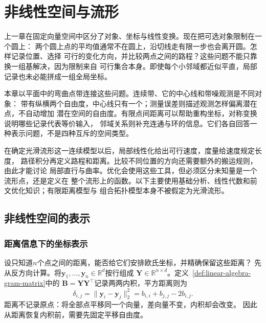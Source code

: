\chapter{非线性空间与流形}
\label{chap:differential-geometry-and-symmetry}

上一章在固定向量空间中区分了对象、坐标与线性变换。现在把可选对象限制在一个圆上：
两个圆上点的平均值通常不在圆上，沿切线走有限一步也会离开圆。怎样记录位置、选择
可行的变化方向，并比较两点之间的路程？这些问题不能只靠换一组基解决，因为限制来自
可行集合本身。即使每个小邻域都近似平直，局部记录也未必能拼成一组全局坐标。

本章以平面中的弯曲点带连接这些问题。连续带、它的中心线和带噪观测是不同对象：
带有纵横两个自由度，中心线只有一个；测量误差则描述观测怎样偏离潜在点，不自动增加
潜在空间的自由度。有限点间距离可以帮助重构坐标，对称变换说明哪些记录代表等价输入，
邻域关系则补充连通与环的信息。它们各自回答一种表示问题，不是四种互斥的空间类型。

在确定光滑流形这一连续模型以后，局部线性化给出可行速度，度量给速度规定长度，
路径积分再定义路程和距离。比较不同位置的方向还需要额外的搬运规则，由此才能讨论
局部直行与曲率。优化会使用这些工具，但必须区分未知量是一个流形点，还是定义在
整个流形上的函数。以下主要使用基础分析、线性代数和前文优化知识；有限距离模型与
组合拓扑模型本身不被假定为光滑流形。

\section{非线性空间的表示}
\label{sec:geometry-nonlinear-representations}

\subsection{距离信息下的坐标表示}
\label{sec:geometry-distance-coordinate-embedding}

设只知道$n$个点之间的距离，能否给它们安排欧氏坐标，并精确保留这些距离？
先从反方向计算。将$\bm y_1,\ldots,\bm y_n\in\mathbb R^d$按行组成
$\bm Y\in\mathbb R^{n\times d}$。定义~\ref{def:linear-algebra-gram-matrix}中的
$\bm B=\bm Y\bm Y^\top$记录两两内积，平方距离则为
\begin{equation}
  \delta_{i,j}=\lVert\bm y_i-\bm y_j\rVert_2^2
  =b_{i,i}+b_{j,j}-2b_{i,j}.
  \label{eq:geometry-distance-from-gram}
\end{equation}
距离不记录原点：将全部点平移同一个向量，差向量不变，内积却会改变。
因此从距离恢复内积前，需要先固定平移自由度。

